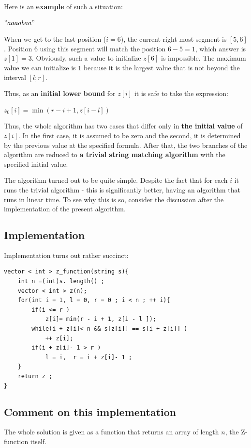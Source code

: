 Here is an \textbf{example} of such a situation:

$" aaaabaa" $

When we get to the last position ($i = 6$), the current right-most segment is $[5, 6]$. Position $6$ using this segment will match the position $6-5 = 1$, which answer  is $z [1] = 3$. Obviously, such a value to initialize $z [6]$ is impossible. The maximum value we can initialize is $1$ because it is the largest value that is not beyond the interval $[l; r]$.

Thus, as an \textbf{initial lower bound} for $z [i]$ it is safe to take the expression:

$z_0 [i] = \min (r-i +1, z [i-l])$

Thus, the whole algorithm has two cases that differ only in \textbf{the initial value} of $z [i]$. In the first case, it is assumed to be zero and the second, it is determined by the previous value at the specified formula. After that, the two branches of the algorithm are reduced to \textbf{a trivial string matching algorithm}  with the specified initial value.

The algorithm turned out to be quite simple. Despite the fact that for each $i$ it runs the trivial algorithm - this is significantly better, having an algorithm that runs in linear time. To see why this is so, consider the discussion after the implementation of the present algorithm.

\subsection{ Implementation }

Implementation turns out rather succinct:

\begin{verbatim}
vector < int > z_function(string s){
    int n =(int)s. length() ;
    vector < int > z(n);
    for(int i = 1, l = 0, r = 0 ; i < n ; ++ i){
        if(i <= r )
            z[i]= min(r - i + 1, z[i - l ]);
        while(i + z[i]< n && s[z[i]] == s[i + z[i]] )
            ++ z[i];
        if(i + z[i]- 1 > r )
            l = i,  r = i + z[i]- 1 ;
    }
    return z ;
} 
\end{verbatim}

\subsection{Comment on this implementation}

The whole solution is given as a function that returns an array of length $n$, the Z-function itself.

